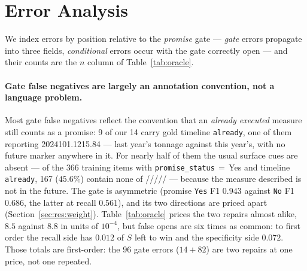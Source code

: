 \section{Error Analysis}
\label{sec:errors}

We index errors by position relative to the \emph{promise} gate --- \emph{gate} errors propagate
into three fields, \emph{conditional} errors occur with the gate correctly open --- and their
counts are the $n$ column of Table~\ref{tab:oracle}.

\paragraph{Gate false negatives are largely an annotation convention, not a language problem.}
Most gate false negatives reflect the convention that an \emph{already executed} measure still
counts as a promise: 9 of our 14 carry gold timeline \texttt{already}, one of them reporting
2024101.1215.84 --- last year's
tonnage against this year's, with no future marker anywhere in it. For nearly half of them
the usual surface cues are absent --- of the 366 training items with
\texttt{promise\_status}\,$=$\,Yes and timeline \texttt{already}, 167 ($45.6\%$) contain none of
///// --- because the measure described is not
in the future. The gate is asymmetric (promise \texttt{Yes} F1 $0.943$ against \texttt{No} F1
$0.686$, the latter at recall $0.561$), and its two directions are priced apart
(Section~\ref{sec:res:weight}). Table~\ref{tab:oracle} prices the two repairs almost alike, $8.5$
against $8.8$ in units of $10^{-4}$, but false opens are six times as common: to first order the
recall side has $0.012$ of $S$ left to win and the specificity side $0.072$. Those totals are
first-order: the 96 gate errors ($14{+}82$) are two repairs at one price, not one repeated.

